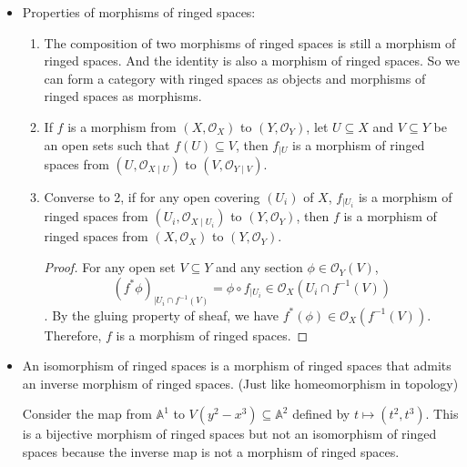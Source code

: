 \documentclass[15pt]{scrartcl}
\newcommand{\A}{\mathbb{A}}
\newcommand{\cO}{\mathcal{O}}
\begin{document}
\begin{itemize}
    Then, a morphism of ringed spaces from $(X,\cO_X)$ to $(Y,\cO_Y)$ is a continuous map $f:X\to Y$ such that for any open set $U\subseteq Y$ and any section $\phi \in \cO_Y(U)$, the pullback $f^{*}(\phi)\in \cO_X(f^{-1}(U))$.
    \item Properties of morphisms of ringed spaces:
    \begin{enumerate}
        \item The composition of two morphisms of ringed spaces is still a morphism of ringed spaces. And the identity is also a morphism of ringed spaces. So we can form a category with ringed spaces as objects and morphisms of ringed spaces as morphisms.
        \item If $f$ is a morphism from $(X,\cO_X)$ to $(Y,\cO_Y)$, let $U\subseteq X$ and $V\subseteq Y$ be an open sets such that $f(U)\subseteq V$, then $f_{\mid U}$ is a morphism of ringed spaces from $(U,\cO_{X\mid U})$ to $(V,\cO_{Y\mid V})$.
        \item Converse to 2, if for any open covering $(U_i)$ of $X$, $f_{\mid U_i}$ is a morphism of ringed spaces from $(U_i,\cO_{X\mid U_i})$ to $(Y,\cO_Y)$, then $f$ is a morphism of ringed spaces from $(X,\cO_X)$ to $(Y,\cO_Y)$. 
        \begin{proof}
            For any open set $V\subseteq Y$ and any section $\phi\in \cO_Y(V)$, 
            \[(f^{*}\phi)_{\mid U_i\cap f^{-1}(V)}=\phi\circ f_{\mid U_i}\in \cO_X(U_i\cap f^{-1}(V))\]. By the gluing property of sheaf, we have $f^{*}(\phi)\in \cO_X(f^{-1}(V))$. Therefore, $f$ is a morphism of ringed spaces.
        \end{proof}
    \end{enumerate}
    \item An isomorphism of ringed spaces is a morphism of ringed spaces that admits an inverse morphism of ringed spaces. (Just like homeomorphism in topology) 
    \begin{example}
        Consider the map from $\A^1$ to $V(y^2-x^3)\subseteq \A^2$ defined by $t\mapsto (t^2,t^3)$. This is a bijective morphism of ringed spaces but not an isomorphism of ringed spaces because the inverse map is not a morphism of ringed spaces. 
        \\
        

\end{example}
\end{itemize}
\end{document}
